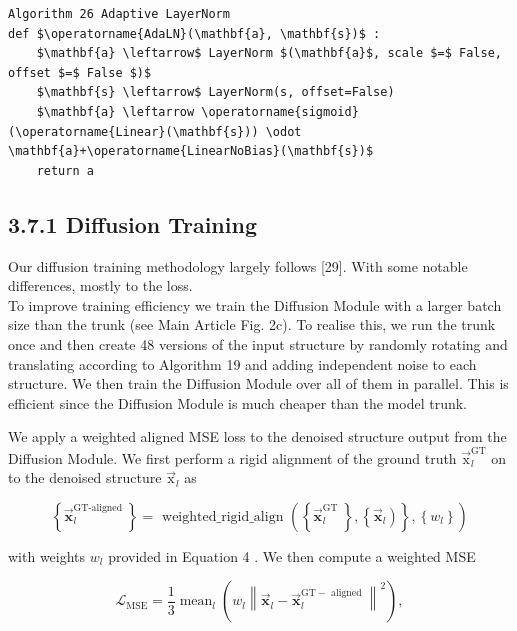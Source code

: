 \documentclass[10pt]{article}
\begin{document}
\begin{verbatim}
Algorithm 26 Adaptive LayerNorm
def $\operatorname{AdaLN}(\mathbf{a}, \mathbf{s})$ :
    $\mathbf{a} \leftarrow$ LayerNorm $(\mathbf{a}$, scale $=$ False, offset $=$ False $)$
    $\mathbf{s} \leftarrow$ LayerNorm(s, offset=False)
    $\mathbf{a} \leftarrow \operatorname{sigmoid}(\operatorname{Linear}(\mathbf{s})) \odot \mathbf{a}+\operatorname{LinearNoBias}(\mathbf{s})$
    return a
\end{verbatim}

\subsection*{3.7.1 Diffusion Training}
Our diffusion training methodology largely follows [29]. With some notable differences, mostly to the loss.\\
To improve training efficiency we train the Diffusion Module with a larger batch size than the trunk (see Main Article Fig. 2c). To realise this, we run the trunk once and then create 48 versions of the input structure by randomly rotating and translating according to Algorithm 19 and adding independent noise to each structure. We then train the Diffusion Module over all of them in parallel. This is efficient since the Diffusion Module is much cheaper than the model trunk.

We apply a weighted aligned MSE loss to the denoised structure output from the Diffusion Module. We first perform a rigid alignment of the ground truth $\overrightarrow{\mathrm{x}}_{l}^{\mathrm{GT}}$ on to the denoised structure $\overrightarrow{\mathrm{x}}_{l}$ as


\begin{equation*}
\left.\left\{\overrightarrow{\mathbf{x}}_{l}^{\text {GT-aligned }}\right\}=\text { weighted_rigid_align }\left(\left\{\overrightarrow{\mathbf{x}}_{l}^{\text {GT }}\right\},\left\{\overrightarrow{\mathbf{x}}_{l}\right)\right\},\left\{w_{l}\right\}\right) \tag{2}
\end{equation*}


with weights $w_{l}$ provided in Equation 4 . We then compute a weighted MSE


\begin{equation*}
\mathcal{L}_{\mathrm{MSE}}=\frac{1}{3} \operatorname{mean}_{l}\left(w_{l}\left\|\overrightarrow{\mathbf{x}}_{l}-\overrightarrow{\mathbf{x}}_{l}^{\mathrm{GT}-\text { aligned }}\right\|^{2}\right), \tag{3}
\end{equation*}
\end{document}
